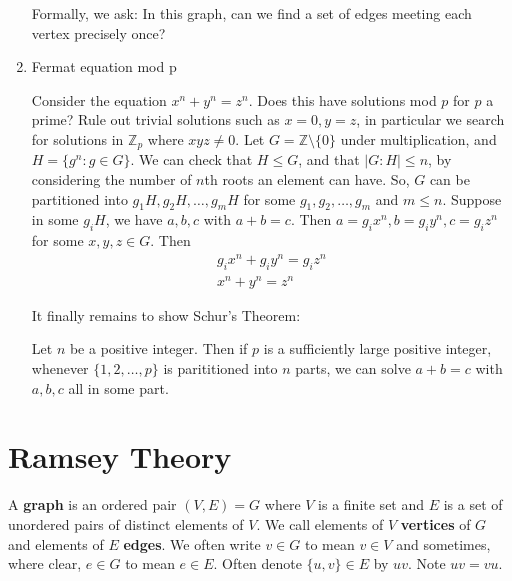 \documentclass{article}
\begin{document}
\begin{eg}
\begin{enumerate}[label=\arabic*.]
            Formally, we ask: In this graph, can we find a set of edges meeting each vertex precisely once?

        \item Fermat equation mod p

            Consider the equation $x^n + y^n = z^n$. Does this have solutions mod $p$ for $p$ a prime?  Rule out trivial solutions such as $x = 0, y = z$, in particular we search for solutions in $\mathbb{Z}_p$ where $xyz \ne 0$.
            Let $G = \mathbb{Z} \setminus \{0\}$ under multiplication, and $H = \{g^n : g \in G\}$.  We can check that $H \leq G$, and that $|G : H| \leq n$, by considering the number of $n$th roots an element can have.
            So, $G$ can be partitioned into $g_1 H, g_2 H, \dots, g_mH$ for some $g_1, g_2, \dots, g_m$ and $m \leq n$.  Suppose in some $g_i H$, we have $a, b, c$ with $a + b = c$.  Then $a = g_i x^n, b = g_i y^n, c = g_i z^n$ for some $x, y, z \in G$.  Then
            \begin{align*}
              g_i x^n + g_i y^n = g_i z^n \\
              x^n + y^n = z^n
            \end{align*}

            It finally remains to show Schur's Theorem:

            \begin{thm}
                Let $n$ be a positive integer. Then if $p$ is a sufficiently large positive integer, whenever $\{1, 2, \dots, p\}$ is parititioned into $n$ parts, we can solve $a + b = c$ with $a, b, c$ all in some part.
            \end{thm}
    \end{enumerate}
\end{eg}

\clearpage
\section{Ramsey Theory}

\begin{defi}
    A \textbf{graph} is an ordered pair $(V, E) = G$ where $V$ is a finite set and $E$ is a set of unordered pairs of distinct elements of $V$.
    We call elements of $V$ \textbf{vertices} of $G$ and elements of $E$ \textbf{edges}.
    We often write $v \in G$ to mean $v \in V$ and sometimes, where clear, $e \in G$ to mean $e \in E$.  Often denote $\{u, v\} \in E$ by $uv$. Note $uv = vu$.
\end{defi}
\end{document}

